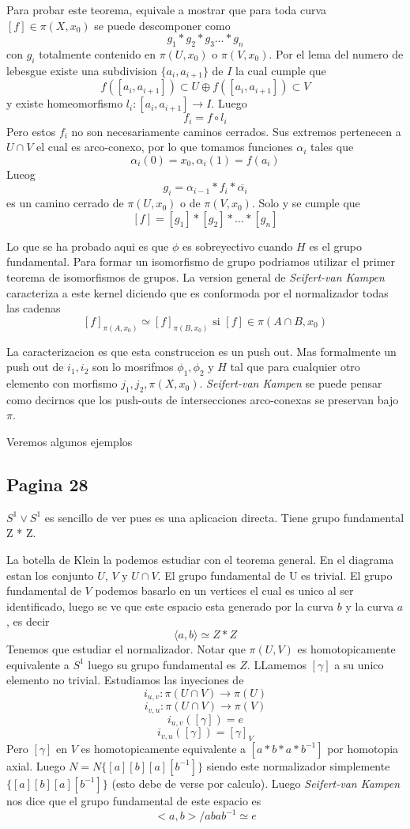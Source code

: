 \documentclass[letterpaper]{article}
\newcommand{\vank}{\emph{Seifert-van Kampen} }
\begin{document}
Para probar este teorema, equivale a mostrar que para toda curva \([f]
\in \pi (X,x_0)\) se puede descomponer como
\[ g_1 * g_2 * g_3 \dots * g_n \]
con \(g_i\) totalmente contenido en \(\pi (U, x_0)\) o \(\pi (V, x_0)\).
Por el lema del numero de lebesgue existe una subdivision \(\{a_i ,
a_{i+1}\}\) de \(I\) la cual cumple que
\[ f \left( [a_i , a_{i+1}] \right) \subset U  \oplus f \left( [a_i ,
    a_{i+1}] \right) \subset V \]
y existe homeomorfismo \(l_i : [a_i , a_{i+1}] \to I \). Luego
\[ f_i = f \circ l_i \]
Pero estos \(f_i\) no son necesariamente caminos cerrados. Sus extremos
pertenecen a \(U \cap V\) el cual es arco-conexo, por lo que tomamos
funciones \(\alpha_i\) tales que
\[ \alpha_i (0) = x_0 , \alpha_i (1) = f(a_i)\]
Lueog
\[ g_i = \alpha_{i-1} * f_i * \overline{\alpha_i} \]
es un camino cerrado de \(\pi(U, x_0)\) o de \(\pi (V,x_0)\). Solo y se
cumple que
\[ [f] = [g_1] * [g_2] * \dots * [g_n] \]

Lo que se ha probado aqui es que \(\phi\) es sobreyectivo cuando \(H\)
es el grupo fundamental. Para formar un isomorfismo de grupo podriamos
utilizar el primer teorema de isomorfismos de grupos. La version general
de \vank caracteriza a este kernel diciendo que es conformoda por el
normalizador todas las cadenas
\[ [f]_{\pi (A,x_0)} \simeq [f]_{\pi (B, x_0)} \text{ si } [f] \in \pi
  (A \cap B, x_0) \]

La caracterizacion es que esta construccion es un push out. Mas
formalmente un push out de \(i_1, i_2\) son lo mosrifmos \(\phi_1,
\phi_2\) y \(H\) tal que para cualquier otro elemento con morfismo
\(j_1, j_2 , \pi (X,x_0)\). \vank se puede pensar como decirnos que los
push-outs de intersecciones arco-conexas se preservan bajo \(\pi\).

Veremos algunos ejemplos

\subsection*{Pagina 28}
\(S^1 \vee S^1\) es sencillo de ver pues es una aplicacion directa.
Tiene grupo fundamental Z * Z.

La botella de Klein la podemos estudiar con el teorema general. En el
diagrama estan los conjunto \(U\), \(V \) y \(U \cap V\). El grupo
fundamental de U es trivial. El grupo fundamental de \(V\) podemos
basarlo en un vertices el cual es unico al ser identificado, luego se ve
que este espacio esta generado por la curva \(b\) y la curva \(a\), es
decir
\[ \langle a,b \rangle \simeq Z * Z \]
Tenemos que estudiar el normalizador. Notar que \(\pi (U,V)\) es
homotopicamente equivalente a \(S^1\) luego su grupo fundamental es
\(Z\). LLamemos \([\gamma]\) a su unico elemento no trivial. Estudiamos
las inyeciones de
\[ i_{u,v} : \pi (U \cap V) \to \pi (U )\]
\[ i_{v,u} : \pi (U \cap V) \to \pi (V) \]
\[ i_{u,v} ([\gamma]) = e \]
\[ i_{v,u} ([\gamma]) = [\gamma]_{V} \]
Pero \([\gamma]\) en \(V\) es homotopicamente equivalente a \([a * b * a *
b^{-1}]\) por homotopia axial. Luego \(N = N \{[a][b][a][b^{-1}]\}\)
siendo este normalizador simplemente \(\{[a][b][a][b^{-1}]\}\) (esto
debe de verse por calculo). Luego \vank nos dice que el grupo
fundamental de este espacio es
\[ <a,b> / {abab^{-1} \simeq e}\]
\end{document}
